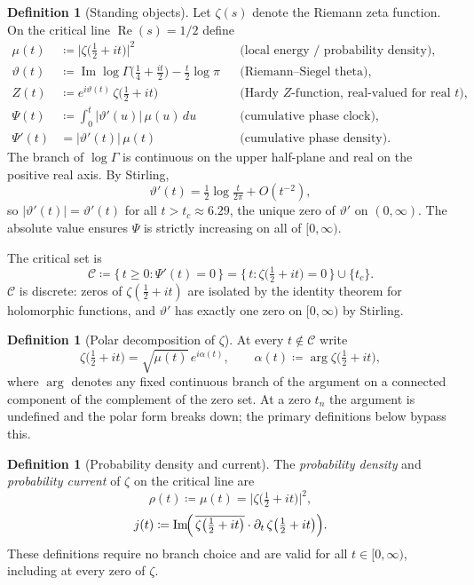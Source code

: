 \documentclass[11pt]{article}
\theoremstyle{plain}
\theoremstyle{definition}
\newtheorem{definition}[theorem]{Definition}
\theoremstyle{remark}
\DeclareMathOperator{\im}{Im}
\DeclareMathOperator{\re}{Re}
\begin{document}
\begin{definition}[Standing objects]
\label{def:objects}
Let $\zeta(s)$ denote the Riemann zeta function. On the critical
line $\re(s) = 1/2$ define
\begin{align}
\mu(t) &\coloneqq \bigl|\zeta\bigl(\tfrac{1}{2}+it\bigr)\bigr|^{2}
&&\text{(local energy / probability density),}\\[4pt]
\vartheta(t) &\coloneqq
\im\log\Gamma\!\bigl(\tfrac{1}{4}+\tfrac{it}{2}\bigr) - \tfrac{t}{2}\log\pi
&&\text{(Riemann--Siegel theta),}\\[4pt]
Z(t) &\coloneqq e^{i\vartheta(t)}\,\zeta\!\bigl(\tfrac{1}{2}+it\bigr)
&&\text{(Hardy $Z$-function, real-valued for real $t$),}\\[4pt]
\Psi(t) &\coloneqq \int_0^t |\vartheta'(u)|\,\mu(u)\,du
&&\text{(cumulative phase clock),}\\[4pt]
\Psi'(t) &= |\vartheta'(t)|\,\mu(t)
&&\text{(cumulative phase density).}
\end{align}
The branch of $\log\Gamma$ is continuous on the upper half-plane and
real on the positive real axis. By Stirling,
\[
\vartheta'(t) = \tfrac{1}{2}\log\tfrac{t}{2\pi} + O(t^{-2}),
\]
so $|\vartheta'(t)| = \vartheta'(t)$ for all $t > t_c \approx 6.29$,
the unique zero of $\vartheta'$ on $(0,\infty)$. The absolute value
ensures $\Psi$ is strictly increasing on all of $[0,\infty)$.

The critical set is
\[
\mathcal{C} \coloneqq \bigl\{\,t\geq 0: \Psi'(t)=0\,\bigr\}
= \bigl\{\,t:\zeta\bigl(\tfrac{1}{2}+it\bigr)=0\,\bigr\} \cup \{t_c\}.
\]
$\mathcal{C}$ is discrete: zeros of $\zeta(\tfrac{1}{2}+it)$ are
isolated by the identity theorem for holomorphic functions, and
$\vartheta'$ has exactly one zero on $[0,\infty)$ by Stirling.
\end{definition}

\begin{definition}[Polar decomposition of $\zeta$]
\label{def:polar}
At every $t \notin \mathcal{C}$ write
\[
\zeta\bigl(\tfrac{1}{2}+it\bigr) = \sqrt{\mu(t)}\,e^{i\alpha(t)},
\qquad
\alpha(t) \coloneqq \arg\zeta\bigl(\tfrac{1}{2}+it\bigr),
\]
where $\arg$ denotes any fixed continuous branch of the argument on a
connected component of the complement of the zero set. At a zero $t_n$
the argument is undefined and the polar form breaks down; the primary
definitions below bypass this.
\end{definition}

\begin{definition}[Probability density and current]
\label{def:current}
The \emph{probability density} and \emph{probability current} of
$\zeta$ on the critical line are
\[
\rho(t) \coloneqq \mu(t)
= \bigl|\zeta\bigl(\tfrac{1}{2}+it\bigr)\bigr|^{2},
\]
\[
j(t) \coloneqq \im\!\Bigl(\,\overline{\zeta\bigl(\tfrac{1}{2}+it\bigr)}
\cdot\partial_t\,\zeta\bigl(\tfrac{1}{2}+it\bigr)\Bigr).
\]
These definitions require no branch choice and are valid for all
$t \in [0,\infty)$, including at every zero of $\zeta$.
\end{definition}
\end{document}
